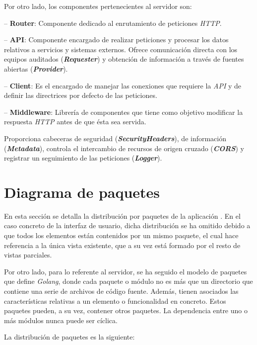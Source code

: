 Por otro lado, los componentes pertenecientes al servidor son:\sn

-- \textbf{Router}: Componente dedicado al enrutamiento de peticiones \textit{HTTP}.\sn

-- \textbf{API}: Componente encargado de realizar peticiones y procesar los datos relativos a servicios y sistemas externos.
Ofrece comunicación directa con los equipos auditados (\textbf{\textit{Requester}}) y obtención de información a través de fuentes abiertas (\textbf{\textit{Provider}}).\n

-- \textbf{Client}: Es el encargado de manejar las conexiones que requiere la \textit{API} y de definir las directrices por defecto de las peticiones.\sn

-- \textbf{Middleware}: Librería de componentes que tiene como objetivo modificar la respuesta \textit{HTTP} antes de que ésta sea servida.

Proporciona cabeceras de seguridad (\textbf{\textit{SecurityHeaders}}), de información (\textbf{\textit{Metadata}}), controla el intercambio de recursos de origen cruzado (\textbf{\textit{CORS}}) y registrar un seguimiento de las peticiones (\textbf{\textit{Logger}}).\sn



\section{Diagrama de paquetes} \label{sec:packagesdiagram}

En esta sección se detalla la distribución por paquetes de la aplicación . En el caso concreto de la interfaz de usuario, dicha distribución se ha omitido debido a que todos los elementos están contenidos por un mismo paquete, el cual hace referencia a la única vista existente, que a su vez está formado por el resto de vistas parciales.\sn

Por otro lado, para lo referente al servidor, se ha seguido el modelo de paquetes que define \textit{Golang}\cite{gomod}, donde cada paquete o módulo no es más que un directorio que contiene una serie de archivos de código fuente. Además, tienen asociados las características relativas a un elemento o funcionalidad en concreto. Estos paquetes pueden, a su vez, contener otros paquetes. La dependencia entre uno o más módulos nunca puede ser cíclica.\sn

La distribución de paquetes es la siguiente:\sn

